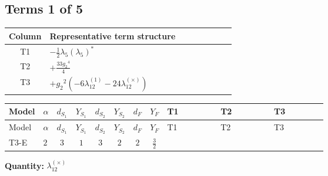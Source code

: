\documentclass[8pt]{article}
\begin{document}
\begin{landscape}
\subsection*{Terms 1 of 5}
\begin{center}
\begin{tabular}{@{}c >{\raggedright\arraybackslash}p{0.82\linewidth}@{}}
\toprule
Column & Representative term structure \\
\midrule
T1 & \(\displaystyle -\frac{1}{2} {\lambda_5} \left({\lambda_5}\right)^{*}\) \\
\midrule
T2 & \(\displaystyle +\frac{33 {g_2}^4}{4}\) \\
\midrule
T3 & \(\displaystyle +{g_2}^2 (-6 {\lambda_{12}^{(1)}}-24 {\lambda_{12}^{(\times)}})\) \\
\midrule
\bottomrule
\end{tabular}
\end{center}
\smallskip
\tiny
\begin{longtable}{@{}llcccccc >{\raggedright\arraybackslash}p{0.21\linewidth} >{\raggedright\arraybackslash}p{0.21\linewidth} >{\raggedright\arraybackslash}p{0.21\linewidth}@{}}
\toprule
Model & $\alpha$ & $d_{S_1}$ & $Y_{S_1}$ & $d_{S_2}$ & $Y_{S_2}$ & $d_F$ & $Y_F$ & T1 & T2 & T3 \\
\midrule
\endfirsthead
\toprule
Model & $\alpha$ & $d_{S_1}$ & $Y_{S_1}$ & $d_{S_2}$ & $Y_{S_2}$ & $d_F$ & $Y_F$ & T1 & T2 & T3 \\
\midrule
\endhead
T3-E & $2$ & $3$ & $1$ & $3$ & $2$ & $2$ & $\frac{3}{2}$ & \scriptsize\adjustbox{max width=\linewidth}{$\begin{gathered} -\frac{1}{2} {\lambda_5} \left({\lambda_5}\right)^{*}\end{gathered}$} & \scriptsize\adjustbox{max width=\linewidth}{$\begin{gathered} +\frac{33 {g_2}^4}{4}\end{gathered}$} & \scriptsize\adjustbox{max width=\linewidth}{$\begin{gathered} +{g_2}^2 (-6 {\lambda_{12}^{(1)}}-24 {\lambda_{12}^{(\times)}})\end{gathered}$} \\
\midrule
\bottomrule
\end{longtable}
\clearpage
\noindent\textbf{Quantity: }$\lambda_{12}^{(\times)}$\par\smallskip

\end{landscape}
\end{document}
